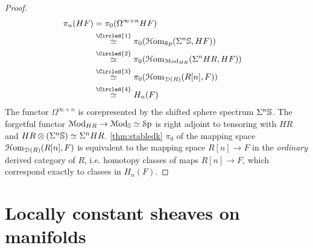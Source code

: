 \documentclass[10pt]{amsart}
\begin{document}
\begin{proof}
  \begin{align*}
    \pi_n(HF) & =\pi_0(\Omega^{\infty+n}HF)\\
    & \overset{\Circled{1}}{\simeq} \pi_0(\Hom_{\Sp}(\Sigma^n\bS,HF)) \\
    & \overset{\Circled{2}}{\simeq} \pi_0(\Hom_{\Mod_{HR}}(\Sigma^n HR,HF)) & \\
    & \overset{\Circled{3}}{\simeq} \pi_0(\Hom_{\lD(R)}(R[n],F))\\
    & \overset{\Circled{4}}{\simeq} H_n(F)
  \end{align*}  The functor $\Omega^{\infty+n}$ is corepresented by the shifted sphere spectrum $\Sigma^n\mathbb{S}$.  The forgetful functor $\mathcal{M}\mathrm{od}_{HR}\to\mathcal{M}\mathrm{od}_{\mathbb{S}}\simeq\mathcal{S}\mathrm{p}$ is right adjoint to tensoring with $HR$ and $HR\otimes(\Sigma^n\mathbb{S})\simeq \Sigma^nHR$.  \cref{thm:stabledk}  $\pi_0$ of the mapping space $\mathcal{H}\mathrm{om}_{\mathcal{D}(R)}(R[n],F)$ is equivalent to the mapping space $R[n]\to F$ in the \emph{ordinary} derived category of $R$, i.e. homotopy classes of maps $R[n]\to F$, which correspond exactly to classes in $H_n(F)$.
\end{proof}

\section{Locally constant sheaves on manifolds}\label{sec:constant sheaves}
\end{document}
